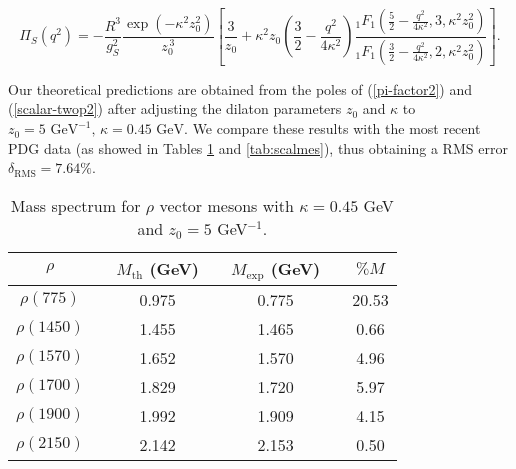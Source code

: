\documentclass{PoS}
\begin{document}
\begin{equation}
\Pi_{S}(q^{2})=-\frac{R^{3}}{g_{S}^{2}}\frac{\exp(-\kappa^{2}z_{0}^{2})}{z_{0}^{\,3}}\left[\frac{3}{z_{0}}+\kappa^{2}z_{0}\left(\frac{3}{2}-\frac{q^{2}}{4\kappa^{2}}\right)\frac{_{1}F_{1}\left(\frac{5}{2}-\frac{q^{2}}{4\kappa^{2}},3,\kappa^{2}z_{0}^{2}\right)}{_{1}F_{1}\left(\frac{3}{2}-\frac{q^{2}}{4\kappa^{2}},2,\kappa^{2}z_{0}^{2}\right)}\right].
\label{scalar-twop2}
\end{equation}

Our theoretical predictions \cite{Cortes:2017lgz} are obtained from the poles of (\ref{pi-factor2}) and (\ref{scalar-twop2}) after adjusting the dilaton parameters $z_{0}$ and $\kappa$ to $z_{0}=\text{5 GeV}^{-1},\,
\kappa=\text{0.45 GeV}$. We compare these results with the most recent PDG data \cite{Olive:2016xmw} (as showed in Tables \ref{tab:vecmes} and \ref{tab:scalmes}), thus obtaining a RMS error $\delta_{\text{RMS}}=\text{7.64}\%$.


\begin{table}[H]
\centering
\begin{tabular}{ccccccc}   \hline \hline
	$\rho$ & & $M_{\text{th}}$ (GeV)& & $M_{\text{exp}}$ (GeV) & & $\% M$  \\ \hline
	$\rho(775)$ & & 0.975  & & 0.775 & & 20.53  \\ 
	$\rho(1450)$  & & 1.455 & & 1.465  & & 0.66 \\
	$\rho(1570)$ & & 1.652 & & 1.570 & & 4.96 \\
	$\rho(1700)$ & & 1.829 & & 1.720 & & 5.97 \\ 
	$\rho(1900)$ & & 1.992 & & 1.909 & & 4.15 \\
	$\rho(2150)$ & & 2.142 & & 2.153 & & 0.50   \\ \hline \hline
\end{tabular}
\caption{Mass spectrum for $\rho$ vector mesons with $\kappa=0.45$ GeV and $z_0=5$ GeV$^{-1}$.}
\label{tab:vecmes}
\end{table}

\vspace{-0.46cm}
\end{document}
